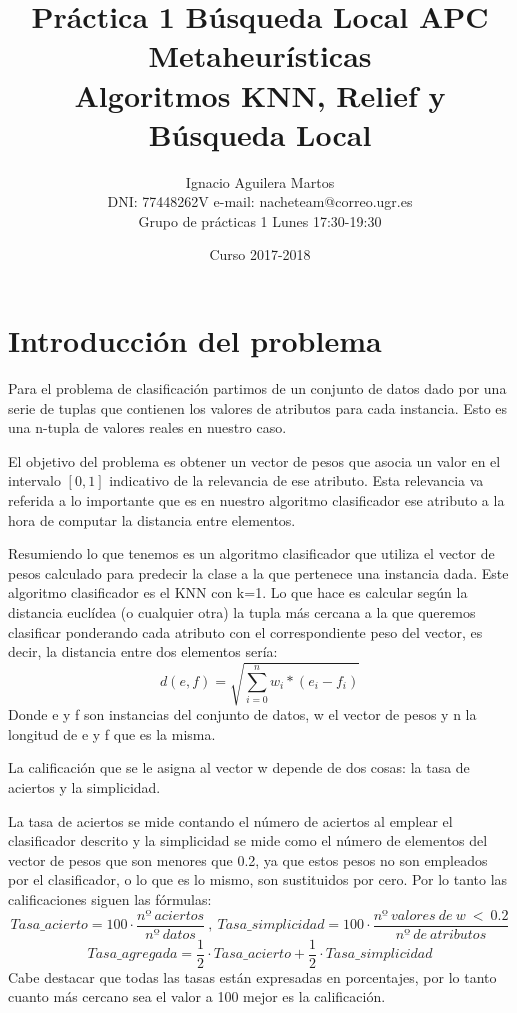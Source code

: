 \documentclass[12pt,a4paper]{article}
\author{Ignacio Aguilera Martos \\
	DNI: 77448262V       e-mail: nacheteam@correo.ugr.es \\
	Grupo de prácticas 1 Lunes 17:30-19:30}
\title{Práctica 1 Búsqueda Local APC \\ Metaheurísticas \\ Algoritmos KNN, Relief y Búsqueda Local}
\date{Curso 2017-2018}
\begin{document}
	\maketitle

	\tableofcontents

	\newpage



	\section{Introducción del problema}
	\label{sec:introProblema}

	Para el problema de clasificación partimos de un conjunto de datos dado por una serie de tuplas que contienen los valores de atributos para cada instancia. Esto es una n-tupla de valores reales en nuestro caso.

	El objetivo del problema es obtener un vector de pesos que asocia un valor en el intervalo $[0,1]$ indicativo de la relevancia de ese atributo. Esta relevancia va referida a lo importante que es en nuestro algoritmo clasificador ese atributo a la hora de computar la distancia entre elementos.

	Resumiendo lo que tenemos es un algoritmo clasificador que utiliza el vector de pesos calculado para predecir la clase a la que pertenece una instancia dada. Este algoritmo clasificador es el KNN con k=1. Lo que hace es calcular según la distancia euclídea (o cualquier otra) la tupla más cercana a la que queremos clasificar ponderando cada atributo con el correspondiente peso del vector, es decir, la distancia entre dos elementos sería:
	$$d(e,f) = \sqrt{\sum_{i=0}^{n}w_i * (e_{i} - f_{i})}$$
	Donde e y f son instancias del conjunto de datos, w el vector de pesos y n la longitud de e y f que es la misma.

	La calificación que se le asigna al vector w depende de dos cosas: la tasa de aciertos y la simplicidad.

	La tasa de aciertos se mide contando el número de aciertos al emplear el clasificador descrito y la simplicidad se mide como el número de elementos del vector de pesos que son menores que 0.2, ya que estos pesos no son empleados por el clasificador, o lo que es lo mismo, son sustituidos por cero. Por lo tanto las calificaciones siguen las fórmulas:
	$$Tasa\_acierto = 100\cdot \frac{nº  \ aciertos}{nº \ datos} \ , \ Tasa\_simplicidad = 100\cdot \frac{nº \ valores \ de \ w \ < \ 0.2}{nº \ de \ atributos}$$
	$$Tasa\_agregada = \frac{1}{2}\cdot Tasa\_acierto + \frac{1}{2}\cdot Tasa\_simplicidad$$
	Cabe destacar que todas las tasas están expresadas en porcentajes, por lo tanto cuanto más cercano sea el valor a 100 mejor es la calificación.
\end{document}
